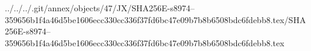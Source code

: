 ../../../.git/annex/objects/47/JX/SHA256E-s8974--359656b1f4a46d5be1606ecc330cc336f37fd6bc47e09b7b8b6508bdc6fdebb8.tex/SHA256E-s8974--359656b1f4a46d5be1606ecc330cc336f37fd6bc47e09b7b8b6508bdc6fdebb8.tex
